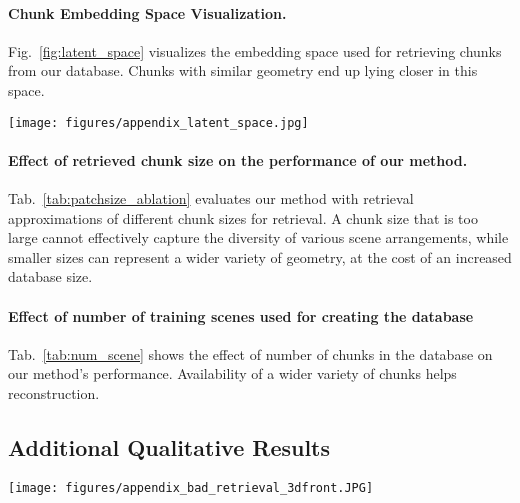 \paragraph{Chunk Embedding Space Visualization.}
%
Fig.~\ref{fig:latent_space} visualizes the embedding space used for retrieving chunks from our database.
%
Chunks with similar geometry end up lying closer in this space.

\begin{figure*}
	\centering
	\texttt{[image: figures/appendix\_latent\_space.jpg]}
	\caption{(a) Chunk embedding space visualized for 5000 chunks from 3DFront test set. This embedding space used for retrievals from the database by projecting an input chunk into this space (visualized as green dots) and retrieving k-nearest database chunks (visualized by yellow dots) from it. (b) Input queries and their corresponding 4 nearest neighbors from the embedding space. For the sake of visual clarity, input queries are visualized as their corresponding ground truth reconstruction.}
	\label{fig:latent_space}
\end{figure*}


\paragraph{Effect of retrieved chunk size on the performance of our method.}
%
Tab.~\ref{tab:patchsize_ablation} evaluates our method with retrieval approximations of different chunk sizes for retrieval.
%
A chunk size that is too large cannot effectively capture the diversity of various scene arrangements, while smaller sizes can represent a wider variety of geometry, at the cost of an increased database size.
%

\paragraph{Effect of number of training scenes used for creating the database}
%
Tab.~\ref{tab:num_scene} shows the effect of number of chunks in the database on our method's performance. Availability of a wider variety of chunks helps reconstruction.

\subsection{Additional Qualitative Results}
\begin{figure*}
	\centering
	\texttt{[image: figures/appendix\_bad\_retrieval\_3dfront.JPG]}
	\caption{Suboptimal retrievals do not improve results significantly over our Backbone network. However, reconstruction produced are also not degraded due to subobtimal retrievals. Qualitative results from 3DFront super-resolution task.}
	\label{fig:bad_retrieval_3dfront}
\end{figure*}

